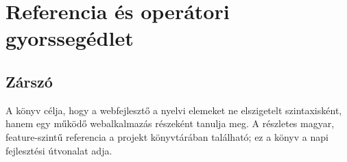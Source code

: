 \documentclass[11pt,a4paper,openany]{book}
\begin{document}
\part{Referencia és operátori gyorssegédlet}



\appendix

\backmatter
\chapter*{Zárszó}
A könyv célja, hogy a webfejlesztő a nyelvi elemeket ne elszigetelt szintaxisként, hanem egy működő webalkalmazás részeként tanulja meg. A részletes magyar, feature-szintű referencia a projekt  könyvtárában található; ez a könyv a napi fejlesztési útvonalat adja.
\end{document}
